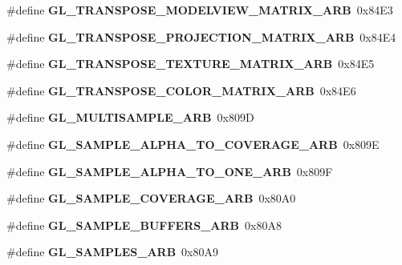 \begin{DoxyCompactItemize}
\item 
\#define {\bfseries G\+L\+\_\+\+T\+R\+A\+N\+S\+P\+O\+S\+E\+\_\+\+M\+O\+D\+E\+L\+V\+I\+E\+W\+\_\+\+M\+A\+T\+R\+I\+X\+\_\+\+A\+R\+B}~0x84\+E3\label{_s_d_l__opengl_8h_a6a8cd8c67fb15508f34b2e362fd1543b}

\item 
\#define {\bfseries G\+L\+\_\+\+T\+R\+A\+N\+S\+P\+O\+S\+E\+\_\+\+P\+R\+O\+J\+E\+C\+T\+I\+O\+N\+\_\+\+M\+A\+T\+R\+I\+X\+\_\+\+A\+R\+B}~0x84\+E4\label{_s_d_l__opengl_8h_a8d5d470f5d732940570ba7f343c67d40}

\item 
\#define {\bfseries G\+L\+\_\+\+T\+R\+A\+N\+S\+P\+O\+S\+E\+\_\+\+T\+E\+X\+T\+U\+R\+E\+\_\+\+M\+A\+T\+R\+I\+X\+\_\+\+A\+R\+B}~0x84\+E5\label{_s_d_l__opengl_8h_ab5344c3088b6af94b7c72b4e4d302cac}

\item 
\#define {\bfseries G\+L\+\_\+\+T\+R\+A\+N\+S\+P\+O\+S\+E\+\_\+\+C\+O\+L\+O\+R\+\_\+\+M\+A\+T\+R\+I\+X\+\_\+\+A\+R\+B}~0x84\+E6\label{_s_d_l__opengl_8h_aca9c5da6ef5315c5c49345949c1bac6e}

\item 
\#define {\bfseries G\+L\+\_\+\+M\+U\+L\+T\+I\+S\+A\+M\+P\+L\+E\+\_\+\+A\+R\+B}~0x809\+D\label{_s_d_l__opengl_8h_af8a2a4cdd1572339a01b657a3a37d856}

\item 
\#define {\bfseries G\+L\+\_\+\+S\+A\+M\+P\+L\+E\+\_\+\+A\+L\+P\+H\+A\+\_\+\+T\+O\+\_\+\+C\+O\+V\+E\+R\+A\+G\+E\+\_\+\+A\+R\+B}~0x809\+E\label{_s_d_l__opengl_8h_a411891855dda47a37df1ef2bd80c182d}

\item 
\#define {\bfseries G\+L\+\_\+\+S\+A\+M\+P\+L\+E\+\_\+\+A\+L\+P\+H\+A\+\_\+\+T\+O\+\_\+\+O\+N\+E\+\_\+\+A\+R\+B}~0x809\+F\label{_s_d_l__opengl_8h_a68cab153252536e5d373c43e9011905a}

\item 
\#define {\bfseries G\+L\+\_\+\+S\+A\+M\+P\+L\+E\+\_\+\+C\+O\+V\+E\+R\+A\+G\+E\+\_\+\+A\+R\+B}~0x80\+A0\label{_s_d_l__opengl_8h_a5a19e0c54d728ef235db1234bb6d70d1}

\item 
\#define {\bfseries G\+L\+\_\+\+S\+A\+M\+P\+L\+E\+\_\+\+B\+U\+F\+F\+E\+R\+S\+\_\+\+A\+R\+B}~0x80\+A8\label{_s_d_l__opengl_8h_a0726922ffc8dd007fbfae5e400330d29}

\item 
\#define {\bfseries G\+L\+\_\+\+S\+A\+M\+P\+L\+E\+S\+\_\+\+A\+R\+B}~0x80\+A9\label{_s_d_l__opengl_8h_a0748808632631e1761050633fe027eb6}


\end{DoxyCompactItemize}

